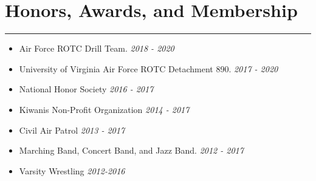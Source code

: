 \documentclass[a4paper]{article}
\begin{document}
\section*{Honors, Awards, and Membership}
\hrule
\vspace{3mm}
\begin{itemize}
	\setlength\itemsep{-0.7mm}
	\item Air Force ROTC Drill Team.
	\hfill \textit{2018 - 2020}
	\item University of Virginia Air Force ROTC Detachment 890.
	\hfill \textit{2017 - 2020}
	\item National Honor Society
	\hfill \textit{2016 - 2017}
	\item Kiwanis Non-Profit Organization
	\hfill \textit{2014 - 2017}
	\item Civil Air Patrol
	\hfill \textit{2013 - 2017}
	\item Marching Band, Concert Band, and Jazz Band.
	\hfill \textit{2012 - 2017}
	\item Varsity Wrestling
	\hfill \textit{2012-2016}
\end{itemize}
\end{document}

